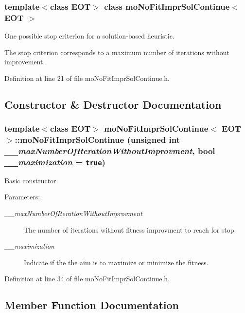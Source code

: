 \subsubsection*{template$<$class EOT$>$ class moNoFitImprSolContinue$<$ EOT $>$}

One possible stop criterion for a solution-based heuristic. 

The stop criterion corresponds to a maximum number of iterations without improvement. 



Definition at line 21 of file moNoFitImprSolContinue.h.

\subsection{Constructor \& Destructor Documentation}
\subsubsection{\setlength{\rightskip}{0pt plus 5cm}template$<$class EOT$>$ {\bf moNoFitImprSolContinue}$<$ EOT $>$::{\bf moNoFitImprSolContinue} (unsigned int {\em \_\-\_\-maxNumberOfIterationWithoutImprovment}, bool {\em \_\-\_\-maximization} = {\tt true})\hspace{0.3cm}{\tt  [inline]}}\label{classmo_no_fit_impr_sol_continue_979c991cbae53e1fd596964837c8d32d}


Basic constructor. 

\begin{Desc}
\item[Parameters:]
\begin{description}
\item[{\em \_\-\_\-maxNumberOfIterationWithoutImprovment}]The number of iterations without fitness improvment to reach for stop. \item[{\em \_\-\_\-maximization}]Indicate if the the aim is to maximize or minimize the fitness. \end{description}
\end{Desc}


Definition at line 34 of file moNoFitImprSolContinue.h.

\subsection{Member Function Documentation}

